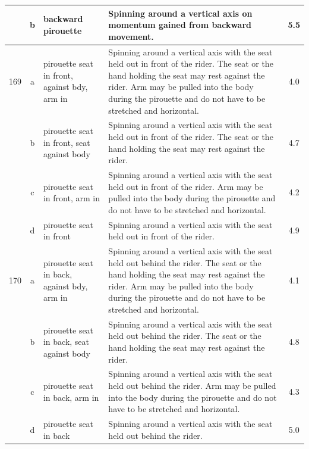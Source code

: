 \begin{longtable}{|r|c|p{4cm}|p{8cm}|c|}
\hline
  & b & backward pirouette  & Spinning around a vertical axis on momentum gained from backward movement.  & 5.5 \\ 
\hline
169 & a & pirouette seat in front, against bdy, arm in  & Spinning around a vertical axis with the seat held out in front of the rider. The seat or the hand holding the seat may rest against the rider. Arm may be pulled into the body during the pirouette and do not have to be stretched and horizontal.  & 4.0 \\ 
\hline
  & b & pirouette seat in front, seat against body  & Spinning around a vertical axis with the seat held out in front of the rider. The seat or the hand holding the seat may rest against the rider. & 4.7 \\ 
\hline
  & c & pirouette seat in front, arm in & Spinning around a vertical axis with the seat held out in front of the rider. Arm may be pulled into the body during the pirouette and do not have to be stretched and horizontal.  & 4.2 \\ 
\hline
  & d & pirouette seat in front & Spinning around a vertical axis with the seat held out in front of the rider. & 4.9 \\ 
\hline
170 & a & pirouette seat in back, against bdy, arm in & Spinning around a vertical axis with the seat held out behind the rider. The seat or the hand holding the seat may rest against the rider. Arm may be pulled into the body during the pirouette and do not have to be stretched and horizontal. & 4.1 \\ 
\hline
  & b & pirouette seat in back, seat against body & Spinning around a vertical axis with the seat held out behind the rider. The seat or the hand holding the seat may rest against the rider.  & 4.8 \\ 
\hline
  & c & pirouette seat in back, arm in  & Spinning around a vertical axis with the seat held out behind the rider. Arm may be pulled into the body during the pirouette and do not have to be stretched and horizontal. & 4.3 \\ 
\hline
  & d & pirouette seat in back  & Spinning around a vertical axis with the seat held out behind the rider.  & 5.0 \\ 
\hline
\end{longtable}
\newpage


